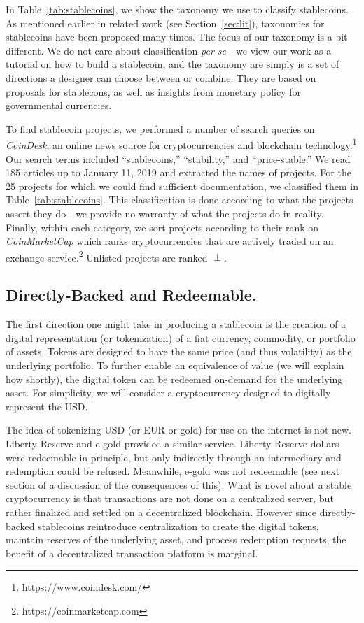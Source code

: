 

In Table~\ref{tab:stablecoins}, we show the taxonomy we use to classify stablecoins. As mentioned earlier in related work (see Section~\ref{sec:lit}), taxonomies for stablecoins have been proposed many times. The focus of our taxonomy is a bit different. We do not care about classification \textit{per se}---we view our work as a tutorial on how to build a stablecoin, and the taxonomy are simply is a set of directions a designer can choose between or combine. They are based on proposals for stablecons, as well as insights from monetary policy for governmental currencies.

To find stablecoin projects, we performed a number of search queries on \textit{CoinDesk}, an online news source for cryptocurrencies and blockchain technology.\footnote{https://www.coindesk.com/} Our search terms included ``stablecoins,'' ``stability,'' and ``price-stable.'' We read 185 articles up to January 11, 2019 and extracted the names of projects. For the 25 projects for which we could find sufficient documentation, we classified them in Table~\ref{tab:stablecoins}. This classification is done according to what the projects assert they do---we provide no warranty of what the projects do in reality. Finally, within each category, we sort projects according to their rank on \textit{CoinMarketCap} which ranks cryptocurrencies that are actively traded on an exchange service.\footnote{https://coinmarketcap.com} Unlisted projects are ranked $\perp$.


\subsection{Directly-Backed and Redeemable.}
\label{sec:redeem}

The first direction one might take in producing a stablecoin is the creation of a digital representation (or tokenization) of a fiat currency, commodity, or portfolio of assets. Tokens are designed to have the same price (and thus volatility) as the underlying portfolio. To further enable an equivalence of value (we will explain how shortly), the digital token can be redeemed on-demand for the underlying asset. For simplicity, we will consider a cryptocurrency designed to digitally represent the USD.

The idea of tokenizing USD (or EUR or gold) for use on the internet is not new. Liberty Reserve and e-gold provided a similar service. Liberty Reserve dollars were redeemable in principle, but only indirectly through an intermediary and redemption could be refused. Meanwhile, e-gold was not redeemable (see next section of a discussion of the consequences of this). What is novel about a stable cryptocurrency is that transactions are not done on a centralized server, but rather finalized and settled on a decentralized blockchain. However since directly-backed stablecoins reintroduce centralization to create the digital tokens, maintain reserves of the underlying asset, and process redemption requests, the benefit of a decentralized transaction platform is marginal.

